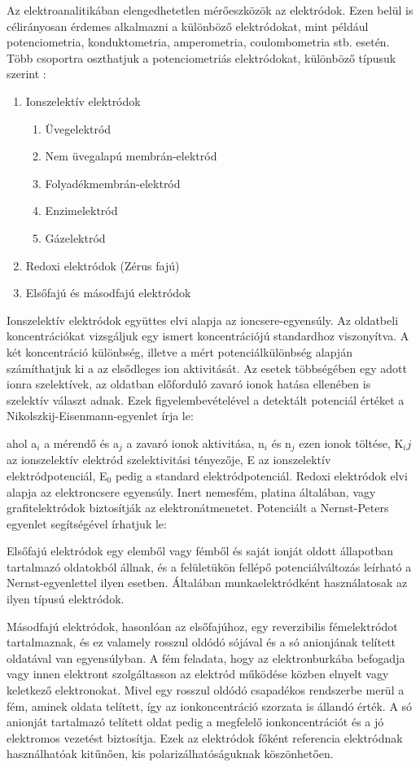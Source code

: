 Az elektroanalitikában elengedhetetlen mérőeszközök az elektródok. Ezen belül is célirányosan érdemes alkalmazni a különböző elektródokat, mint például potenciometria, konduktometria, amperometria, coulombometria stb. esetén.
Több csoportra oszthatjuk a potenciometriás elektródokat, különböző típusuk szerint \cite{kalman2002az}:
\begin{enumerate}  
    \item Ionszelektív elektródok
      \begin{enumerate}
	\item Üvegelektród
	\item Nem üvegalapú membrán-elektród
	\item Folyadékmembrán-elektród
	\item Enzimelektród
	\item Gázelektród
	\end{enumerate}
    \item Redoxi elektródok (Zérus fajú)
    \item Elsőfajú és másodfajú elektródok
\end{enumerate}
Ionszelektív elektródok együttes elvi alapja az ioncsere-egyensúly. Az oldatbeli koncentrációkat vizsgáljuk egy ismert koncentrációjú standardhoz viszonyítva. A két koncentráció különbség, illetve a mért potenciálkülönbség alapján számíthatjuk ki a az elsődleges ion aktivitását. Az esetek többségében egy adott ionra szelektívek, az oldatban előforduló zavaró ionok hatása ellenében is szelektív választ adnak. Ezek figyelembevételével a detektált potenciál értéket a Nikolszkij-Eisenmann-egyenlet írja le:

ahol a$_i$  a mérendő és a$_j$ a zavaró ionok aktivitása, n$_i$ és n$_j$ ezen ionok töltése, K$_ij$ az ionszelektív elektród szelektivitási tényezője, E az ionszelektív elektródpotenciál, E$_0$ pedig a standard elektródpotenciál.
Redoxi elektródok elvi alapja az elektroncsere egyensúly. Inert nemesfém, platina általában, vagy grafitelektródok biztosítják az elektronátmenetet. Potenciált a Nernst-Peters egyenlet segítségével írhatjuk le:

Elsőfajú elektródok egy elemből vagy fémből és saját ionját oldott állapotban tartalmazó oldatokból állnak, és a felületükön fellépő potenciálváltozás leírható a Nernst-egyenlettel ilyen esetben. Általában munkaelektródként használatosak az ilyen típusú elektródok.

Másodfajú elektródok, hasonlóan az elsőfajúhoz, egy reverzibilis fémelektródot tartalmaznak, és ez valamely rosszul oldódó sójával és a só anionjának telített oldatával van egyensúlyban. A fém feladata, hogy az elektronburkába befogadja vagy innen elektront szolgáltasson az elektród működése közben elnyelt vagy keletkező elektronokat. Mivel egy rosszul oldódó csapadékos rendszerbe merül a fém, aminek oldata telített, így az ionkoncentráció szorzata is állandó érték. A só anionját tartalmazó telített oldat pedig a megfelelő ionkoncentrációt és a jó elektromos vezetést biztosítja. Ezek az elektródok főként referencia elektródnak használhatóak kitűnően, kis polarizálhatóságuknak köszönhetően.

